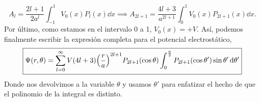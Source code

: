 \documentclass[11pt]{article}
\theoremstyle{definition}
\numberwithin{equation}{section}
\begin{document}
\begin{equation}
    A_l = \frac{2l+1}{2a^l}\int_{-1}^{1} V_0(x)P_l(x)\dd{x}\implies A_{2l+1} = \frac{4l+3}{a^{2l+1}}\int_{0}^{1} V_0(x)P_{2l+1}(x)\dd{x}.
\end{equation}
Por último, como estamos en el intervalo 0 a 1, $V_0(x) = +V$. Así, podemos finalmente escribir la expresión completa para el potencial electrostático,
\begin{equation}
    \boxed{\Psi(r,\theta) = \sum_{l=0}^{\infty}V(4l+3)\pqty{\frac{r}{a}}^{2l+1}P_{2l+1}(\cos\theta)\int_{0}^{\frac{\pi}{2}}P_{2l+1}(\cos\theta')\sin\theta'\dd{\theta'}}
\end{equation}
Donde nos devolvimos a la variable $\theta$ y usamos $\theta'$ para enfatizar el hecho de que el polinomio de la integral es distinto.
\end{document}
